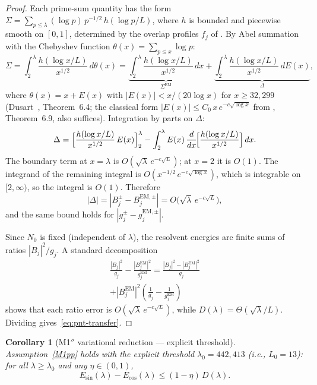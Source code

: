 \documentclass[12pt,a4paper]{article}
\newtheorem{corollary}[theorem]{Corollary}
\theoremstyle{definition}
\theoremstyle{remark}
\begin{document}
\begin{proof}
Each prime-sum quantity has the form $\Sigma = \sum_{p \leq \lambda} (\log p)\,p^{-1/2}\,h(\log p/L)$, where $h$ is bounded and piecewise smooth on $[0,1]$, determined by the overlap profiles $f_j$ of . By Abel summation with the Chebyshev function $\theta(x) = \sum_{p \leq x} \log p$:
\[
  \Sigma = \int_2^{\lambda} \frac{h(\log x/L)}{x^{1/2}}\,d\theta(x)
  = \underbrace{\int_2^{\lambda} \frac{h(\log x/L)}{x^{1/2}}\,dx}_{\Sigma^{\mathrm{EM}}}
  + \underbrace{\int_2^{\lambda} \frac{h(\log x/L)}{x^{1/2}}\,dE(x)}_{\Delta},
\]
where $\theta(x) = x + E(x)$ with $|E(x)| < x/(20\log x)$ for $x \geq 32{,}299$ (Dusart~\cite{Dusart2010}, Theorem~6.4; the classical form $|E(x)| \leq C_0\,x\,e^{-c\sqrt{\log x}}$ from \cite{IwaniecKowalski2004}, Theorem~6.9, also suffices). Integration by parts on $\Delta$:
\[
  \Delta = \Bigl[\frac{h(\log x/L)}{x^{1/2}}\,E(x)\Bigr]_2^{\lambda}
  - \int_2^{\lambda} E(x)\,\frac{d}{dx}\!\Bigl[\frac{h(\log x/L)}{x^{1/2}}\Bigr]\,dx.
\]
The boundary term at $x = \lambda$ is $O(\sqrt{\lambda}\,e^{-c\sqrt{L}})$; at $x = 2$ it is $O(1)$. The integrand of the remaining integral is $O(x^{-1/2}\,e^{-c\sqrt{\log x}})$, which is integrable on $[2,\infty)$, so the integral is $O(1)$. Therefore
\begin{equation}
\label{eq:pnt-error}
  |\Delta| = |B_j^{\pm} - B_j^{\mathrm{EM},\pm}| = O\!\bigl(\sqrt{\lambda}\,e^{-c\sqrt{L}}\bigr),
\end{equation}
and the same bound holds for $|g_j^{\pm} - g_j^{\mathrm{EM},\pm}|$.

Since $N_0$ is fixed (independent of $\lambda$), the resolvent energies are finite sums of ratios $|B_j|^2/g_j$. A standard decomposition
\begin{multline*}
  \frac{|B_j|^2}{g_j} - \frac{|B_j^{\mathrm{EM}}|^2}{g_j^{\mathrm{EM}}}
  = \frac{|B_j|^2 - |B_j^{\mathrm{EM}}|^2}{g_j} \\
  + |B_j^{\mathrm{EM}}|^2\!\left(\frac{1}{g_j} - \frac{1}{g_j^{\mathrm{EM}}}\right)
\end{multline*}
shows that each ratio error is $O(\sqrt{\lambda}\,e^{-c\sqrt{L}})$, while $D(\lambda) = \Theta(\sqrt{\lambda}/L)$. Dividing gives~\eqref{eq:pnt-transfer}.
\end{proof}

\begin{corollary}[M1$''$ variational reduction --- explicit threshold]
\label{cor:M1-proved}
Assumption~\ref{M1pp} holds with the explicit threshold $\lambda_0 = 442{,}413$ (i.e., $L_0 = 13$): for all $\lambda \geq \lambda_0$ and any $\eta \in (0,1)$,
\[
  E_{\sin}(\lambda) - E_{\cos}(\lambda) \leq (1-\eta)\,D(\lambda).
\]
\end{corollary}
\end{document}
